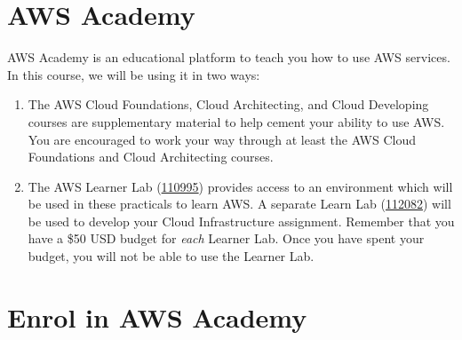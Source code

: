 \documentclass{csse4400}
\begin{document}
\section{AWS Academy}
AWS Academy is an educational platform to teach you how to use AWS services.
In this course, we will be using it in two ways:
\begin{enumerate}
    \item The AWS Cloud Foundations, Cloud Architecting, and Cloud Developing courses are supplementary material to help cement your ability to use AWS.
          You are encouraged to work your way through at least the AWS Cloud Foundations and Cloud Architecting courses.
    \item The AWS Learner Lab (\href{https://awsacademy.instructure.com/courses/110995}{110995})
          provides access to an environment which will be used in these practicals to learn AWS. 
          A separate Learn Lab (\href{https://awsacademy.instructure.com/courses/112082}{112082})
          will be used to develop your Cloud Infrastructure assignment.
          Remember that you have a \$50 USD budget for \textit{each} Learner Lab.
          Once you have spent your budget, you will not be able to use the Learner Lab.
\end{enumerate}

\section{Enrol in AWS Academy}
\end{document}
